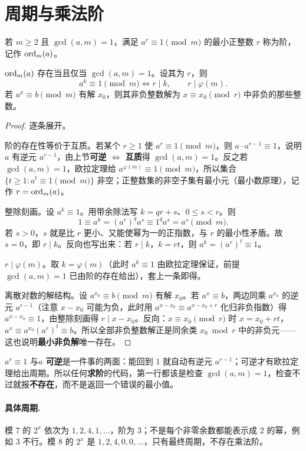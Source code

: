 \section{周期与乘法阶}
\begin{definition}
若 $m\ge2$ 且 $\gcd(a,m)=1$，满足 $a^r\equiv1\pmod m$ 的最小正整数 $r$ 称为阶，记作 $\operatorname{ord}_m(a)$。
\end{definition}
\begin{theorem}
$\operatorname{ord}_m(a)$ 存在当且仅当 $\gcd(a,m)=1$。设其为 $r$，则
\[
 a^k\equiv1\pmod m\iff r\mid k,\qquad r\mid\varphi(m).
\]
若 $a^x\equiv b\pmod m$ 有解 $x_0$，则其非负整数解为 $x\equiv x_0\pmod r$ 中非负的那些整数。
\end{theorem}
\begin{proof}
逐条展开。

阶的存在性等价于互质。若某个 $r\ge1$ 使 $a^r\equiv1\pmod m$，则 $a\cdot a^{r-1}\equiv1$，说明 $a$ 有逆元 $a^{r-1}$，由上节\textbf{可逆 $\iff$ 互质}得 $\gcd(a,m)=1$。反之若 $\gcd(a,m)=1$，欧拉定理给 $a^{\varphi(m)}\equiv1\pmod m$，所以集合 $\{t\ge1:a^t\equiv1\pmod m\}$ 非空；正整数集的非空子集有最小元（最小数原理），记作 $r=\operatorname{ord}_m(a)$。

整除刻画。设 $a^k\equiv1$。用带余除法写 $k=qr+s$、$0\le s<r$。则
\[
 1\equiv a^k=(a^r)^qa^s\equiv1^q a^s=a^s\pmod m.
\]
若 $s>0$，$s$ 就是比 $r$ 更小、又能使幂为一的正指数，与 $r$ 的最小性矛盾。故 $s=0$，即 $r\mid k$。反向也写出来：若 $r\mid k$，$k=rt$，则 $a^k=(a^r)^t\equiv1$。

$r\mid\varphi(m)$。取 $k=\varphi(m)$（此时 $a^k\equiv1$ 由欧拉定理保证，前提 $\gcd(a,m)=1$ 已由阶的存在给出），套上一条即得。

离散对数的解结构。设 $a^{x_0}\equiv b\pmod m$ 有解 $x_0$。若 $a^x\equiv b$，两边同乘 $a^{x_0}$ 的逆元 $a^{r-1}$（注意 $x-x_0$ 可能为负，此时用 $a^{x-x_0}\equiv a^{x-x_0+r}$ 化归非负指数）得 $a^{x-x_0}\equiv1$，由整除刻画得 $r\mid x-x_0$。反向：$x\equiv x_0\pmod r$ 时 $x=x_0+rt$，$a^x\equiv a^{x_0}(a^r)^t\equiv b$。所以全部非负整数解正是同余类 $x_0\bmod r$ 中的非负元——这也说明\textbf{最小非负解}唯一存在。
\end{proof}

\begin{tip}[为什么：求阶前先查 $\gcd(a,m)=1$]
$a^r\equiv1$ 与\textbf{$a$ 可逆}是一件事的两面：能回到 $1$ 就自动有逆元 $a^{r-1}$；可逆才有欧拉定理给出周期。所以任何\textbf{求阶}的代码，第一行都该是检查 $\gcd(a,m)=1$，检查不过就报\textbf{不存在}，而不是返回一个错误的最小值。
\end{tip}


\paragraph{具体周期.} 模 $7$ 的 $2^x$ 依次为 $1,2,4,1,\ldots$，阶为 $3$；不是每个非零余数都能表示成 $2$ 的幂，例如 $3$ 不行。模 $8$ 的 $2^x$ 是 $1,2,4,0,0,\ldots$，只有最终周期，不存在乘法阶。
